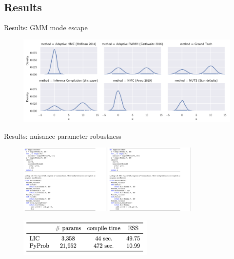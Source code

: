 \subsection{Results}

\begin{frame}{Results: GMM mode escape}
    \begin{figure}
        \centering
        \includegraphics[width=\textwidth]{Figures/lic/gmm-escape.png}
    \end{figure}
\end{frame}

\begin{frame}{Results: nuisance parameter robustness}
    \begin{figure}[p]
        \centering
        \includegraphics[width=0.4\textwidth,trim={0 16cm 20cm 0.5cm},clip]{Figures/lic/nuisance-progs.png}
        \includegraphics[width=0.4\textwidth,trim={0 0.5cm 20cm 12.5cm},clip]{Figures/lic/nuisance-progs.png}
    \end{figure}
    \begin{figure}
        \centering
        \includegraphics[width=0.6\textwidth]{Figures/lic/nuisance-params.png}
    \end{figure}
\end{frame}

